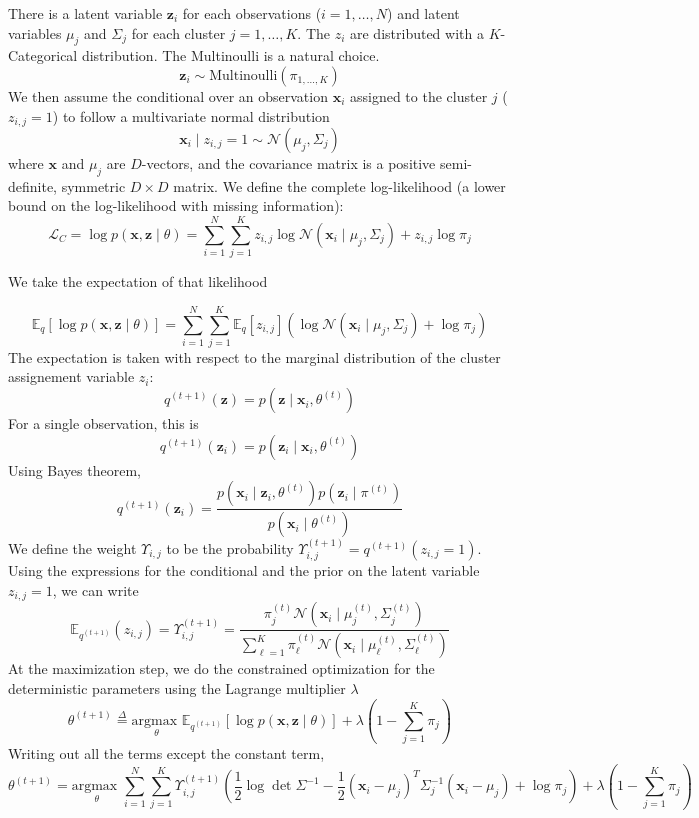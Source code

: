 \documentclass{article}
\numberwithin{equation}{section}
\theoremstyle{named}
\begin{document}
There is a  latent variable $\mathbf{z}_i$ for each observations ($i=1,\dots, N$) and latent variables $\mu_j$ and $\Sigma_j$ for each cluster $j = 1,\dots,K$. The $z_{i}$ are distributed with a $K$-Categorical distribution. The Multinoulli is a natural choice.
$$
  \mathbf{z}_i \sim \text{Multinoulli}(\pi_{1,\dots,K})
$$
We then assume the conditional over an observation $\mathbf{x}_i$ assigned to the cluster $j$ ($z_{i, j} = 1$) to follow a multivariate normal distribution
$$
\mathbf{x}_i \mid z_{i, j} = 1 \sim \mathcal{N}(\mu_j, \Sigma_j)
$$
where $\mathbf{x}$ and $\mu_j$ are $D$-vectors, and the covariance 
matrix is a positive semi-definite, symmetric $D \times D$ matrix. We define 
the complete log-likelihood (a lower bound on the log-likelihood with missing 
information):
$$
\mathcal{L}_C = \log p(\mathbf{x}, \mathbf{z} \mid  \theta) = \sum_{i = 1}^N \sum_{j = 1}^K
    z_{i, j} \log \mathcal{N}(\mathbf{x}_i \mid \mu_j , \Sigma_j) 
    + z_{i, j} \log \pi_j
$$

We take the expectation of that likelihood 

$$
 \mathbb{E}_q\left[\log p(\mathbf{x}, \mathbf{z} \mid  \theta) \right] 
 =  \sum_{i = 1}^N \sum_{j = 1}^K
    \mathbb{E}_q[z_{i, j}] (\log \mathcal{N}(\mathbf{x}_i \mid \mu_j , \Sigma_j) 
    +  \log \pi_j)
$$
The expectation is taken with respect to the marginal distribution 
of the cluster assignement variable $z_i$:
$$
 q^{(t + 1)}(\mathbf{z}) = p(\mathbf{z} \mid \mathbf{x}_i , \theta^{(t)})
$$
For a single observation, this is 
$$
  q^{(t + 1)}(\mathbf{z}_i) = p(\mathbf{z}_i \mid \mathbf{x}_i , \theta^{(t)})
$$
Using Bayes theorem, 
$$
  q^{(t + 1)}(\mathbf{z}_i) = \frac{p(\mathbf{x}_i \mid \mathbf{z}_i,  \theta^{(t)}) p(\mathbf{z}_i \mid \pi^{(t)})}{p(\mathbf{x}_i \mid \theta^{(t)})}
$$
We define the weight 
$\Upsilon_{i, j}$ to be the probability 
$\Upsilon_{i, j}^{(t + 1)} = q^{(t + 1)}(z_{i, j} = 1)$.
Using the expressions for the conditional and the prior on the 
latent variable $z_{i, j} = 1$, we can write
$$
\mathbb{E}_{q^{(t + 1)}}(z_{i, j}) = 
        \Upsilon^{(t + 1)}_{i, j} = 
        \frac{
                \pi_j^{(t)} \mathcal{N}(\mathbf{x}_i \mid \mu_j^{(t)}, \Sigma_j^{(t)})
                }{
                \displaystyle \sum_{\ell = 1}^K \pi_\ell^{(t)}
                \mathcal{N}(\mathbf{x}_i \mid \mu_\ell^{(t)}, \Sigma_\ell^{(t)})
} 
$$
At the maximization step, we do the constrained optimization
for the deterministic parameters using the Lagrange multiplier $\lambda$
$$
\theta^{(t + 1)} \overset{\Delta}{=} \underset{\theta}{\text{argmax }} 
\mathbb{E}_{q^{(t +1)}} [\log p(\mathbf{x}, \mathbf{z} \mid \theta)] + \lambda 
\left(1 - \sum_{j = 1}^{K} \pi_j\right)
$$
Writing out all the terms except the constant term, 
\[
        \theta^{(t+1)} =  \underset{\theta}{\text{argmax }} 
        \sum_{i = 1}^{N} \sum_{j = 1}^{K}\Upsilon_{i, j}^{(t + 1)} 
        \left( 
        \frac{1}{2}\log \det \Sigma^{-1}
        - \frac{1}{2} (\mathbf{x}_i - \mu_j)^T \Sigma^{-1}_j (\mathbf{x}_i - \mu_j)
        + \log \pi_j
        \right)
        +
        \lambda\left(1 - \sum_{j = 1}^{K} \pi_j\right)
\]
\end{document}
